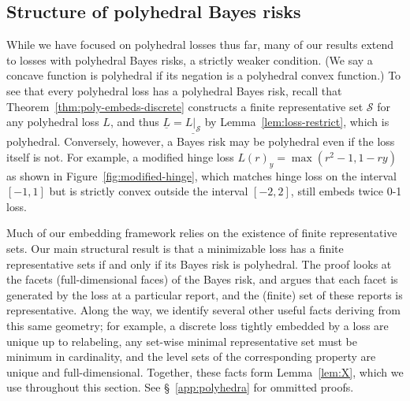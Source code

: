 \documentclass[twoside,11pt]{article}
\newcommand{\Comments}{1}
\newcommand{\mynote}[2]{\ifnum\Comments=1\textcolor{#1}{#2}\fi}
\newcommand{\raf}[1]{\mynote{darkgreen}{[RF: #1]}}
\newcommand{\jessie}[1]{\mynote{teal}{[JF: #1]}}
\newcommand{\Sc}{\mathcal{S}}
\newcommand{\risk}[1]{\underline{#1}}
\begin{document}

\subsection{Structure of polyhedral Bayes risks}

While we have focused on polyhedral losses thus far, many of our results extend to losses with polyhedral Bayes risks, a strictly weaker condition.
(We say a concave function is polyhedral if its negation is a polyhedral convex function.)
To see that every polyhedral loss has a polyhedral Bayes risk, recall that Theorem~\ref{thm:poly-embeds-discrete} constructs a finite representative set $\Sc$ for any polyhedral loss $L$, and thus $\risk{L} = \risk{L|_\Sc}$ by Lemma~\ref{lem:loss-restrict}, which is polyhedral.
Conversely, however, a Bayes risk may be polyhedral even if the loss itself is not.
For example, a modified hinge loss $L(r)_y = \max(r^2-1,1-ry)$
as shown in Figure~\ref{fig:modified-hinge}, which matches hinge loss on the interval $[-1,1]$ but is strictly convex outside the interval $[-2,2]$, still embeds twice 0-1 loss.

Much of our embedding framework relies on the existence of finite representative sets.
Our main structural result is that a minimizable loss has a finite representative sets if and only if its Bayes risk is polyhedral.
The proof looks at the facets (full-dimensional faces) of the Bayes risk, and argues that each facet is generated by the loss at a particular report, and the (finite) set of these reports is representative.
Along the way, we identify several other useful facts deriving from this same geometry; for example, a discrete loss tightly embedded by a loss are unique up to relabeling, any set-wise minimal representative set must be minimum in cardinality, and the level sets of the corresponding property are unique and full-dimensional.
Together, these facts form Lemma~\ref{lem:X}, which we use throughout this section.
See \S~\ref{app:polyhedra} for ommitted proofs.
\end{document}
